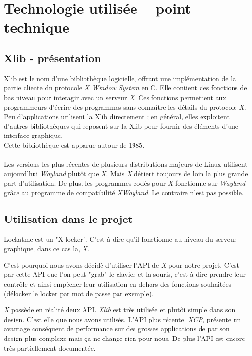 \documentclass[french]{report}
\begin{document}
\section{Technologie utilisée – point technique}

\subsection{Xlib - présentation}

Xlib est le nom d'une bibliothèque logicielle, offrant une implémentation de la
partie cliente du protocole \emph{X Window System} en C. Elle contient des fonctions
de bas niveau pour interagir avec un serveur \emph{X}. Ces fonctions permettent aux
programmeurs d'écrire des programmes sans connaître les détails du protocole \emph{X}.
Peu d'applications utilisent la Xlib directement ; en général, elles exploitent
d'autres bibliothèques qui reposent sur la Xlib pour fournir des éléments
d'une interface graphique.\\
Cette bibliothèque est apparue autour de 1985.\\\\
Les versions les plus récentes de plusieurs distributions majeurs de Linux utilisent
aujourd'hui \emph{Wayland} plutôt que \emph{X}. Mais \emph{X} détient toujours de loin la plus
grande part d'utilisation. De plus, les programmes codés pour \emph{X} fonctionne
sur \emph{Wayland} grâce au programme de compatibilité \emph{XWayland}. Le contraire n'est pas
possible.

\subsection{Utilisation dans le projet}

Lockatme est un "X locker". C'est-à-dire qu'il fonctionne au niveau du serveur graphique,
dans ce cas la, \emph{X}.

C'est pourquoi nous avons décidé d'utiliser l'API de \emph{X} pour notre projet. C'est par
cette API que l'on peut "grab" le clavier et la souris, c'est-à-dire prendre leur contrôle
et ainsi empêcher leur utilisation en dehors des fonctions souhaitées (délocker le
locker par mot de passe par exemple).

\emph{X} possède en réalité deux API. \emph{Xlib} est très utilisée et plutôt
simple dans son design.
C'est elle que nous avons utilisés. L'API plus récente, \emph{XCB}, présente un
avantage conséquent de performance sur des grosses applications de par son design
plus complexe mais ça ne change rien pour nous. De plus l'API est encore
très partiellement documentée.
\end{document}
